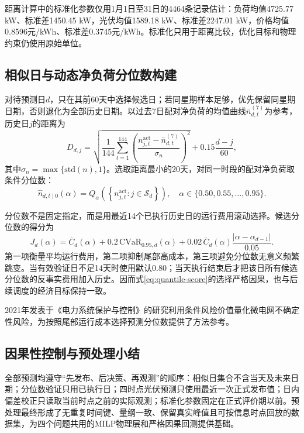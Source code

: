 \documentclass[UTF8,a4paper,12pt,fontset=fandol]{ctexart}
\numberwithin{equation}{section}
\begin{document}
距离计算中的标准化参数仅用1月1日至31日的4464条记录估计：负荷均值4725.77 kW、标准差1450.45 kW，光伏均值1589.18 kW、标准差2247.01 kW，价格均值0.8596元/kWh、标准差0.3745元/kWh。标准化只用于距离比较，优化目标和物理约束仍使用原始单位。

\subsection{相似日与动态净负荷分位数构建}

对待预测日$d$，只在其前60天中选择候选日；若同星期样本足够，优先保留同星期日期，否则退化为全部历史日期。以过去7日配对净负荷的均值曲线$\bar n^{(7)}_{d,t}$为参考，历史日$j$的距离为
\begin{equation}
D_{d,j}=\sqrt{\frac{1}{144}\sum_{t=1}^{144}
\left(\frac{n^{\mathrm{act}}_{j,t}-\bar n^{(7)}_{d,t}}{\sigma_n}\right)^2}
+0.15\frac{d-j}{60},
\label{eq:similar-score}
\end{equation}
其中$\sigma_n=\max\{\mathrm{std}(n),1\}$。选取距离最小的20天，对同一时段的配对净负荷取条件分位数：
\begin{equation}
\widehat n_{d,t\mid0}(\alpha)=Q_{\alpha}\!\left(
\left\{n^{\mathrm{act}}_{j,t}:j\in\mathcal S_d\right\}\right),
\quad \alpha\in\{0.50,0.55,\ldots,0.95\}.
\label{eq:net-quantile}
\end{equation}

分位数不是固定指定，而是用最近14个已执行历史日的运行费用滚动选择。候选分位数的得分为
\begin{equation}
J_d(\alpha)=\overline C_d(\alpha)+0.2\,\mathrm{CVaR}_{0.95,d}(\alpha)
+0.02\,\overline C_d(\alpha)\frac{|\alpha-\alpha_{d-1}|}{0.05}.
\label{eq:quantile-score}
\end{equation}
第一项衡量平均运行费用，第二项抑制尾部高成本，第三项避免分位数无意义频繁跳变。当有效验证日不足14天时使用默认0.80；当天执行结束后才把该日所有候选分位数的反事实费用加入历史。因而式\ref{eq:quantile-score}的选择严格因果，也与后续调度的经济目标保持一致。

2021年发表于《电力系统保护与控制》的研究利用条件风险价值量化微电网不确定性风险，为按照尾部运行成本选择预测分位数提供了方法参考\cite{chen2021cvar}。

\subsection{因果性控制与预处理小结}

全部预测均遵守“先发布、后决策、再观测”的顺序：相似日集合不含当天及未来日期；分位数验证只用已执行日；四时点光伏预测只使用最近一次正式发布值；日内偏差校正只读取当前时点之前的实际观测；标准化参数固定在正式评价期以前。预处理最终形成了无重复时间键、量纲一致、保留真实峰值且可按信息时点回放的数据集，为四个问题共用的MILP物理层和严格因果回测提供基础。
\end{document}
